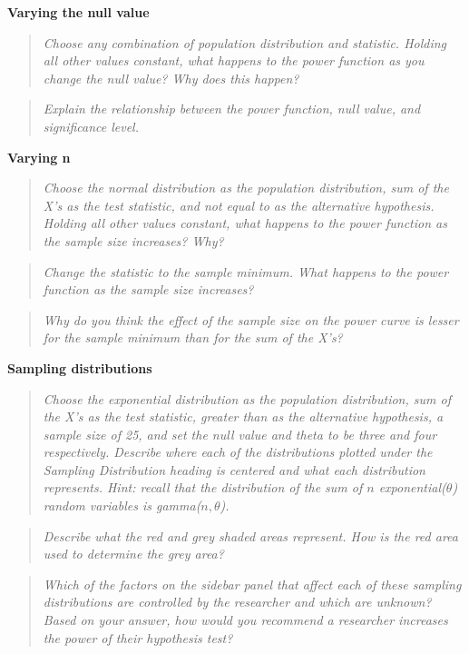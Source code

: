 \documentclass{TISE}
\begin{document}
\textbf{Varying the null value}

\begin{quote}
	\textit{Choose any combination of population distribution and statistic. Holding all other values constant, what happens to the power function as you change the null value? Why does this happen?}
\end{quote}

\begin{quote}
	\textit{Explain the relationship between the power function, null value, and significance level.}
\end{quote}

\textbf{Varying n}

\begin{quote}
	\textit{Choose the normal distribution as the population distribution, sum of the X's as the test statistic, and not equal to as the alternative hypothesis. Holding all other values constant, what happens to the power function as the sample size increases? Why?}
\end{quote}

\begin{quote}
	\textit{Change the statistic to the sample minimum. What happens to the power function as the sample size increases?}
\end{quote}

\begin{quote}
	\textit{Why do you think the effect of the sample size on the power curve is lesser for the sample minimum than for the sum of the X's?}
\end{quote}

\textbf{Sampling distributions}

\begin{quote}
	\textit{Choose the exponential distribution as the population distribution, sum of the X's as the test statistic, greater than as the alternative hypothesis, a sample size of 25, and set the null value and theta to be three and four respectively. Describe where each of the distributions plotted under the Sampling Distribution heading is centered and what each distribution represents. Hint: recall that the distribution of the sum of $n$ exponential($\theta$) random variables is gamma($n, \theta$).}
\end{quote}

\begin{quote}
	\textit{Describe what the red and grey shaded areas represent. How is the red area used to determine the grey area?}
\end{quote}

\begin{quote}
	\textit{Which of the factors on the sidebar panel that affect each of these sampling distributions are controlled by the researcher and which are unknown? Based on your answer, how would you recommend a researcher increases the power of their hypothesis test?}
\end{quote}
\end{document}
